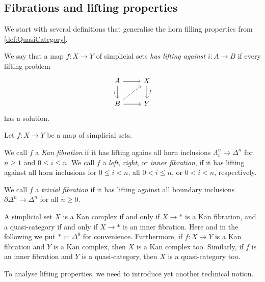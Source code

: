 \subsection{Fibrations and lifting properties}\label{subsec:Fibrations}
We start with several definitions that generalise the horn filling properties from \cref{def:QuasiCategory}.
\begin{defi}\label{def:Lifting}
	We say that a map $f\colon X\rightarrow Y$ of simplicial sets \emph{has lifting against $i\colon A\rightarrow B$} if every lifting problem
	\begin{equation*}
		\begin{tikzcd}
			A\rar\dar["i"']& X\dar["f"]\\
			B\rar\urar[dashed] & Y
		\end{tikzcd}
	\end{equation*}
	has a solution.
\end{defi}
\begin{defi}\label{def:Fibration}
	Let $f\colon X\rightarrow Y$ be a map of simplicial sets.
	\begin{alphanumerate}
		\item We call $f$ a \emph{Kan fibration} if it has lifting agains all horn inclusions $\Lambda_i^n\rightarrow \Delta^n$ for $n\geqslant 1$ and $0\leqslant i\leqslant n$. We call $f$ a \emph{left}, \emph{right}, or \emph{inner fibration}, if it has lifting against all horn inclusions for $0\leqslant i<n$, all $0<i\leqslant n$, or $0<i<n$, respectively.\label{enum:KanFibration}
		\item We call $f$ a \emph{trivial fibration} if it has lifting against all boundary inclusions $\partial\Delta^n\rightarrow\Delta^n$ for all $n\geqslant 0$.\label{enum:TrivialFibration}
	\end{alphanumerate}
\end{defi}
\begin{exm}\label{exm:KanFibration}
	A simplicial set $X$ is a Kan complex if and only if $X\rightarrow *$ is a Kan fibration, and a quasi-category if and only if $X\rightarrow *$ is an inner fibration. Here and in the following we put $*\coloneqq\Delta^0$ for convenience. Furthermore, if $f\colon X\rightarrow Y$ is a Kan fibration and $Y$ is a Kan complex, then $X$ is a Kan complex too. Similarly, if $f$ is an inner fibration and $Y$ is a quasi-category, then $X$ is a quasi-category too.
\end{exm}
To analyse lifting properties, we need to introduce yet another technical notion.
